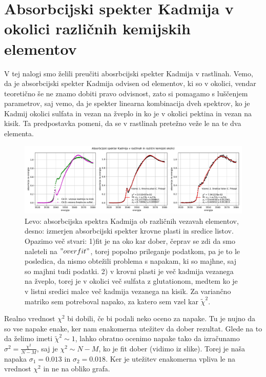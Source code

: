 \documentclass[11pt, a4paper]{article}
\begin{document}
\section{Absorbcijski spekter Kadmija v okolici različnih kemijskih elementov}
V tej nalogi smo želili preučiti abosrbcijski spekter Kadmija v rastlinah. Vemo, da je absorbcijski spekter Kadmija odvisen od elementov, ki so v okolici, vendar teoretično še ne znamo dobiti pravo odvisnost, zato si pomagamo s luščenjem parametrov, saj vemo, da je spekter linearna kombinacija dveh spektrov, ko je Kadmij okolici sulfata in vezan na žveplo in ko je v okolici pektina in vezan na kisik. Ta predpostavka pomeni, da se v rastlinah pretežno veže le na te dva elementa. \newline\newline
\begin{figure}[H]
\hspace*{-2.2cm}     
  \includegraphics[width=20.5cm]{tretja_fit.pdf}
  \caption{Levo: absorbcijska spektra Kadmija ob različnih vezavah elementov, desno: izmerjen absorbcijski spekter krovne plasti in sredice listov. Opazimo več stvari: 1)fit je na oko kar dober, čeprav se zdi da smo naleteli na $"overfit"$, torej popolno prileganje podatkom, pa je to le posledica, da nismo obtežili problema s napakam, ki so majhne, saj so majhni tudi podatki. 
  2) v krovni plasti je več kadmija vezanega na žveplo, torej je v okolici več sulfata z glutationom, medtem ko je v listni sredici malce več kadmija vezanega na kisik.
  Za variančno matriko sem potreboval napako, za katero sem vzel kar $\widetilde{\chi}^2$.}
\end{figure}
Realno vrednost $\chi^2$ bi dobili, če bi podali neko oceno za napake. Tu je nujno da so vse napake enake, ker nam enakomerna utežitev da dober rezultat. Glede na to da želimo imeti $\widetilde{\chi}^2 \sim 1 $, lahko obratno ocenimo napake tako da izračunamo $\sigma^2 = \frac{\chi^2}{N-M}$, saj je $\chi^2 \sim N-M$, ko je fit dober (vidimo iz slike). Torej je naša napaka $\sigma_1 = 0.013$ in $\sigma_2 = 0.018$. Ker je utežitev enakomerna vpliva le na vrednost $\chi^2$ in ne na obliko grafa.
\end{document}
